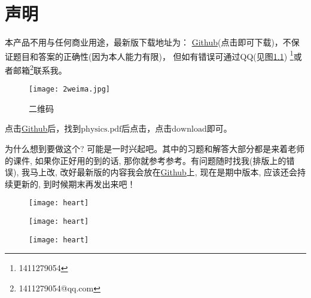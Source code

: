 \chapter{声明}
本产品不用与任何商业用途，最新版下载地址为：
\href{https://github.com/1411279054/Letax-learning-Note/tree/master/%E5%A4%A7%E5%AD%A6%E7%89%A9%E7%90%86%E5%A4%8D%E4%B9%A0%E6%8C%87%E5%8D%97}{Github}(点击即可下载)，不保证题目和答案的正确性(因为本人能力有限)，
但如有错误可通过QQ(见图\ref{fig:1}) \footnote{1411279054}或者邮箱\footnote{1411279054@qq.com}联系我。
\begin{figure}[htbp]
	\centering
	\texttt{[image: 2weima.jpg]}
	\caption{二维码}\label{fig:1}
\end{figure}

点击\href{https://github.com/1411279054/Letax-learning-Note/tree/master/%E5%A4%A7%E5%AD%A6%E7%89%A9%E7%90%86%E5%A4%8D%E4%B9%A0%E6%8C%87%E5%8D%97}{Github}后，找到$\mathrm{physics.pdf}$后点击，点击$\mathrm{download}$即可。
\\
\begin{remarkname}
	为什么想到要做这个? 可能是一时兴起吧。其中的习题和解答大部分都是来着老师的课件, 如果你正好用的到的话, 那你就参考参考。有问题随时找我(排版上的错误), 我马上改, 改好最新版的内容我会放在\href{https://github.com/1411279054/Letax-learning-Note/tree/master/%E5%A4%A7%E5%AD%A6%E7%89%A9%E7%90%86%E5%A4%8D%E4%B9%A0%E6%8C%87%E5%8D%97}{Github}上, 现在是期中版本, 应该还会持续更新的, 到时候期末再发出来吧！
\end{remarkname}
\begin{figure}[H]
	\centering
	\parbox[t]{0.3\textwidth}{
		\centering
		\texttt{[image: heart]}
	}
	\parbox[t]{0.3\textwidth}{
		\centering
		\texttt{[image: heart]}
	}
	\parbox[t]{0.3\textwidth}{
		\centering
		\texttt{[image: heart]}
	}
\end{figure}